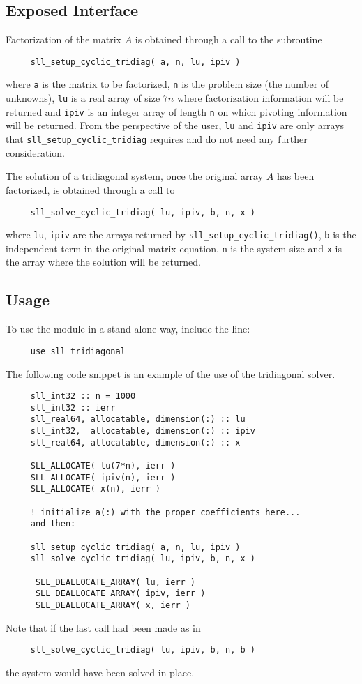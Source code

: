 \documentclass[]{report}   %
\begin{document}
\subsection{Exposed Interface}
Factorization of the matrix $A$ is obtained through a call to the subroutine
\begin{verbatim}
     sll_setup_cyclic_tridiag( a, n, lu, ipiv )
\end{verbatim}
where \verb+a+ is the matrix to be factorized, \verb+n+ is the problem size (the number of unknowns), \verb+lu+ is a real array of size $7n$ where factorization information will be returned and \verb+ipiv+ is an integer array of length \verb+n+ on which pivoting information will be returned. From the perspective of the user, \verb+lu+ and \verb+ipiv+ are only arrays that \verb+sll_setup_cyclic_tridiag+ requires and do not need any further consideration.

The solution of a tridiagonal system, once the original array $A$ has been factorized, is obtained through a call to 
\begin{verbatim}
     sll_solve_cyclic_tridiag( lu, ipiv, b, n, x )
\end{verbatim}
where \verb+lu+, \verb+ipiv+ are the arrays returned by \verb+sll_setup_cyclic_tridiag()+, \verb+b+ is the independent term in the original matrix equation, \verb+n+ is the system size and \verb+x+ is the array where the solution will be returned.
  
\subsection{Usage}
To use the module in a stand-alone way, include the line:
\begin{verbatim}
     use sll_tridiagonal
\end{verbatim}
The following code snippet is an example of the use of the tridiagonal solver.
\begin{verbatim}
     sll_int32 :: n = 1000
     sll_int32 :: ierr
     sll_real64, allocatable, dimension(:) :: lu
     sll_int32,  allocatable, dimension(:) :: ipiv
     sll_real64, allocatable, dimension(:) :: x

     SLL_ALLOCATE( lu(7*n), ierr )
     SLL_ALLOCATE( ipiv(n), ierr )
     SLL_ALLOCATE( x(n), ierr )
     
     ! initialize a(:) with the proper coefficients here... 
     and then:
     
     sll_setup_cyclic_tridiag( a, n, lu, ipiv )
     sll_solve_cyclic_tridiag( lu, ipiv, b, n, x )
     
      SLL_DEALLOCATE_ARRAY( lu, ierr )
      SLL_DEALLOCATE_ARRAY( ipiv, ierr )
      SLL_DEALLOCATE_ARRAY( x, ierr )
\end{verbatim}
Note that if the last call had been made as in
\begin{verbatim}
     sll_solve_cyclic_tridiag( lu, ipiv, b, n, b )
\end{verbatim}
the system would have been solved in-place.
\end{document}
